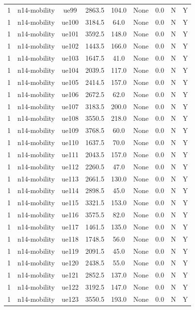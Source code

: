 \begin{table}[ht]
\begin{tabular}{|c|c|c|c|c|c|c|c|c|}
1 & n14-mobility & ue99 & 2863.5 & 104.0 & None & 0.0 & N & Y \\
1 & n14-mobility & ue100 & 3184.5 & 64.0 & None & 0.0 & N & Y \\
1 & n14-mobility & ue101 & 3592.5 & 148.0 & None & 0.0 & N & Y \\
1 & n14-mobility & ue102 & 1443.5 & 166.0 & None & 0.0 & N & Y \\
1 & n14-mobility & ue103 & 1647.5 & 41.0 & None & 0.0 & N & Y \\
1 & n14-mobility & ue104 & 2039.5 & 117.0 & None & 0.0 & N & Y \\
1 & n14-mobility & ue105 & 2414.5 & 157.0 & None & 0.0 & N & Y \\
1 & n14-mobility & ue106 & 2672.5 & 62.0 & None & 0.0 & N & Y \\
1 & n14-mobility & ue107 & 3183.5 & 200.0 & None & 0.0 & N & Y \\
1 & n14-mobility & ue108 & 3550.5 & 218.0 & None & 0.0 & N & Y \\
1 & n14-mobility & ue109 & 3768.5 & 60.0 & None & 0.0 & N & Y \\
1 & n14-mobility & ue110 & 1637.5 & 70.0 & None & 0.0 & N & Y \\
1 & n14-mobility & ue111 & 2043.5 & 157.0 & None & 0.0 & N & Y \\
1 & n14-mobility & ue112 & 2260.5 & 47.0 & None & 0.0 & N & Y \\
1 & n14-mobility & ue113 & 2661.5 & 130.0 & None & 0.0 & N & Y \\
1 & n14-mobility & ue114 & 2898.5 & 45.0 & None & 0.0 & N & Y \\
1 & n14-mobility & ue115 & 3321.5 & 153.0 & None & 0.0 & N & Y \\
1 & n14-mobility & ue116 & 3575.5 & 82.0 & None & 0.0 & N & Y \\
1 & n14-mobility & ue117 & 1461.5 & 135.0 & None & 0.0 & N & Y \\
1 & n14-mobility & ue118 & 1748.5 & 56.0 & None & 0.0 & N & Y \\
1 & n14-mobility & ue119 & 2091.5 & 45.0 & None & 0.0 & N & Y \\
1 & n14-mobility & ue120 & 2438.5 & 55.0 & None & 0.0 & N & Y \\
1 & n14-mobility & ue121 & 2852.5 & 137.0 & None & 0.0 & N & Y \\
1 & n14-mobility & ue122 & 3192.5 & 147.0 & None & 0.0 & N & Y \\
1 & n14-mobility & ue123 & 3550.5 & 193.0 & None & 0.0 & N & Y \\

\end{tabular}
\end{table}
